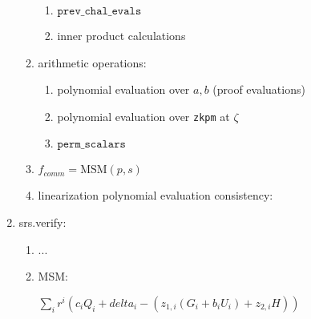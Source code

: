 \begin{enumerate}
\begin{enumerate}
\begin{enumerate}
			\item $\texttt{prev\_chal\_evals}$
			\item inner product calculations
		\end{enumerate}
		\item arithmetic operations:
		\begin{enumerate}
			\item polynomial evaluation over $a, b$ (proof evaluations)
			\item polynomial evaluation over \texttt{zkpm} at $\zeta$
			\item $\texttt{perm\_scalars}$
		\end{enumerate}
		\item $f_{comm} = \text{MSM}(p, s)$ %
		\item linearization polynomial evaluation consistency:  %
	\end{enumerate} 
	\item srs.verify: %
	\begin{enumerate}
		\item ...
		\item MSM:
		\begin{center}
			$\sum\limits_i r^i (c_i Q_i + delta_i - ( z_{1, i} (G_i + b_i U_i) + z_{2, i} H ))$
		\end{center}
	\end{enumerate}
\end{enumerate}